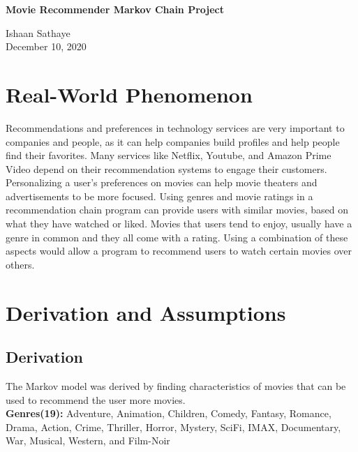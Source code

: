 \documentclass{article}
\begin{document}
\begin{titlepage}
    \centering
    \vspace*{\fill}

    \vspace*{0.5cm}

    \huge\bfseries
    Movie Recommender Markov Chain Project

    \vspace*{0.5cm}

    \large Ishaan Sathaye \\
    \large December 10, 2020

    \vspace*{\fill}
\end{titlepage}
\newpage
\tableofcontents

\newpage
\section{Real-World Phenomenon}
Recommendations and preferences in technology services are very important to 
companies and people, as it can help companies build profiles and help people find their favorites.
Many services like Netflix, Youtube, and Amazon Prime Video depend on their recommendation systems to engage their customers.
Personalizing a user's preferences on movies can help movie theaters and advertisements to be more focused. Using genres and movie ratings
in a recommendation chain program can provide users with similar movies, based on what they have watched or liked. Movies that users 
tend to enjoy, usually have a genre in common and they all come with a rating. Using a combination of these aspects would allow a program to 
recommend users to watch certain movies over others. 

\section{Derivation and Assumptions}
\subsection{Derivation}
The Markov model was derived by finding characteristics of movies that can be used to recommend the user more movies.\\

\textbf{Genres(19):} Adventure, Animation, Children, Comedy, Fantasy, Romance, Drama, Action, Crime, Thriller, Horror, Mystery, SciFi, IMAX, Documentary,
War, Musical, Western, and Film-Noir
\end{document}
